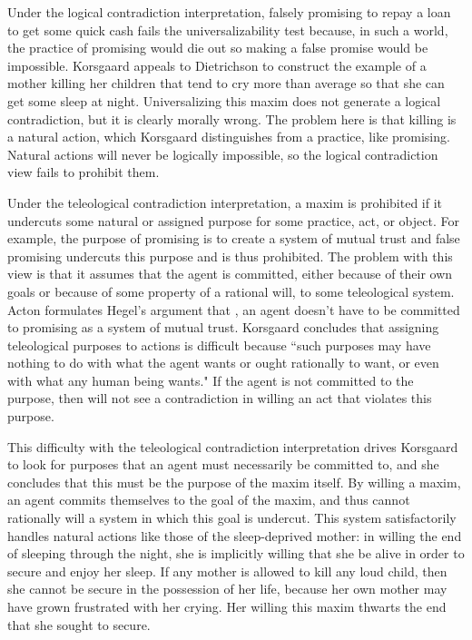 \begin{isabellebody}
\begin{isamarkuptext}
Under the logical contradiction interpretation, falsely promising to repay a loan to get some quick cash
fails the universalizability test because, in such a world, the practice of promising would die out so 
making a false promise would be impossible. Korsgaard appeals to Dietrichson \cite{dietrichson} to construct the example of 
a mother killing her children that tend to cry more than average so that she can get some 
sleep at night. Universalizing this maxim does not generate a logical contradiction, but it is clearly 
morally wrong. The problem here is that killing is a natural action, which Korsgaard distinguishes from 
a practice, like promising. Natural actions will never be logically impossible, so the logical contradiction 
view fails to prohibit them.

Under the teleological contradiction interpretation, a maxim is prohibited if it undercuts some natural 
or assigned purpose for some practice, act, or object. For example, the purpose of promising is to 
create a system of mutual trust and false promising undercuts this purpose and is thus prohibited. The problem 
with this view is that it assumes that the agent is committed, either because of their own goals or 
because of some property of a rational will, to some teleological system. Acton formulates Hegel's argument that \cite{acton},
an agent doesn't have to be committed to promising as a system of mutual trust. Korsgaard concludes that 
assigning teleological purposes to actions is difficult because ``such purposes may have
nothing to do with what the agent wants or ought rationally to want, or even with what
any human being wants." If the agent is not committed to the purpose, then will not see a contradiction 
in willing an act that violates this purpose.

This difficulty with the teleological contradiction interpretation drives Korsgaard to look for purposes
that an agent must necessarily be committed to, and she concludes that this must be the purpose of the 
maxim itself. By willing a maxim, an agent commits themselves to the goal of the maxim, and thus cannot 
rationally will a system in which this goal is undercut. This system satisfactorily handles natural actions
like those of the sleep-deprived mother: in willing the end of sleeping through the night, she is 
implicitly willing that she be alive in order to secure and enjoy her sleep. If any mother is allowed to kill
any loud child, then she cannot be secure in the possession of her life, because her own mother may have 
grown frustrated with her crying. Her willing this maxim thwarts the end that she sought to secure. 


\end{isamarkuptext}
\end{isabellebody}
